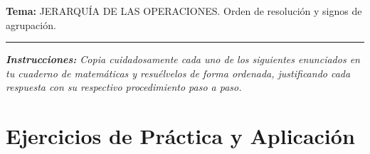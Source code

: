 \documentclass[12pt, letterpaper]{article}
\begin{document}
	\vspace{0.2cm}
	\noindent \textbf{Tema:} JERARQUÍA DE LAS OPERACIONES. Orden de resolución y signos de agrupación.
	\vspace{0.2cm}
	\hrule
	\vspace{0.4cm}
	
	\noindent \textit{\textbf{Instrucciones:} Copia cuidadosamente cada uno de los siguientes enunciados en tu cuaderno de matemáticas y resuélvelos de forma ordenada, justificando cada respuesta con su respectivo procedimiento paso a paso.}
	\vspace{0.6cm}
	
	\section*{Ejercicios de Práctica y Aplicación}
	
\end{document}
